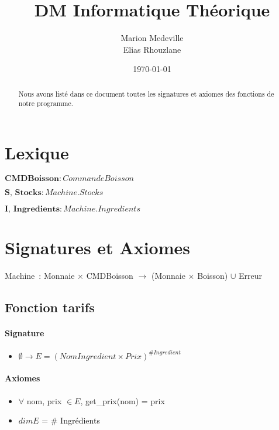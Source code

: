 \documentclass[]{article}
\date{}
\begin{document}
\title{DM Informatique Théorique}
\author{Marion Medeville \\
Elias Rhouzlane}
\date{\today}
 
\maketitle
\begin{abstract}
Nous avons listé dans ce document toutes les signatures et axiomes des fonctions de notre programme.
\end{abstract}
\section*{Lexique}
\begin{description}
  \item
 $ \textbf{CMDBoisson} : CommandeBoisson$
\item
   $\textbf{S, Stocks} : Machine.Stocks$
 \item
 $ \textbf{I, Ingredients} : Machine.Ingredients$
\end{description}
\section*{Signatures et Axiomes}

Machine~: Monnaie \(\times \) CMDBoisson \(\longrightarrow \) (Monnaie \(\times \) Boisson) \(\cup \) Erreur

\subsection*{Fonction tarifs}
\paragraph{Signature}
\begin{itemize}
\item
  $\emptyset \longrightarrow  E = (NomIngredient \times Prix) ^{\#Ingredient}$
\end{itemize}
\paragraph{Axiomes}
\begin{itemize}
\item
   $\forall$ nom, prix $\in E$, get\_prix(nom) = prix 
 \item
$dim E$ = \(\#\) Ingrédients
\end{itemize}
\end{document}
